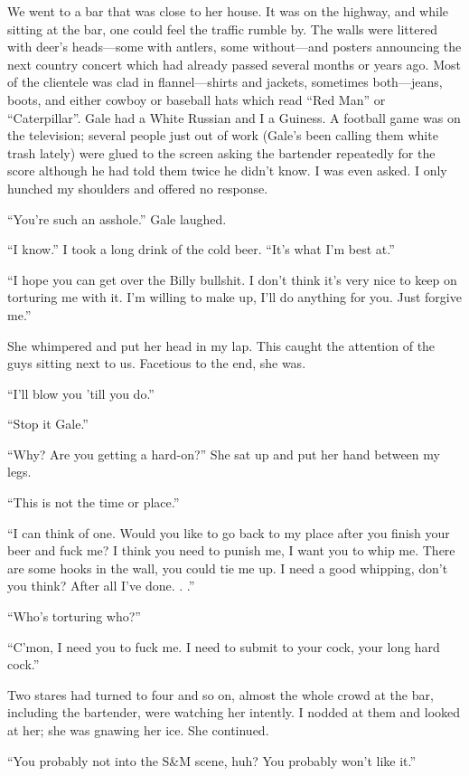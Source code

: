 We went to a bar that was close to her house. It was on the highway, and
while sitting at the bar, one could feel the traffic rumble by. The
walls were littered with deer's heads---some with antlers, some
without---and posters announcing the next country concert which had
already passed several months or years ago. Most of the clientele was
clad in flannel---shirts and jackets, sometimes both---jeans, boots, and
either cowboy or baseball hats which read ``Red Man'' or
``Caterpillar''. Gale had a White Russian and I a Guiness. A football
game was on the television; several people just out of work (Gale's been
calling them white trash lately) were glued to the screen asking the
bartender repeatedly for the score although he had told them twice he
didn't know. I was even asked. I only hunched my shoulders and offered
no response.

``You're such an asshole.'' Gale laughed.

``I know.'' I took a long drink of the cold beer. ``It's what I'm best
at.''

``I hope you can get over the Billy bullshit. I don't think it's very
nice to keep on torturing me with it. I'm willing to make up, I'll do
anything for you. Just forgive me.''

She whimpered and put her head in my lap. This caught the attention of
the guys sitting next to us. Facetious to the end, she was.

``I'll blow you 'till you do.''

``Stop it Gale.''

``Why? Are you getting a hard-on?'' She sat up and put her hand between
my legs.

``This is not the time or place.''

``I can think of one. Would you like to go back to my place after you
finish your beer and fuck me? I think you need to punish me, I want you
to whip me. There are some hooks in the wall, you could tie me up. I
need a good whipping, don't you think? After all I've done. . .''

``Who's torturing who?''

``C'mon, I need you to fuck me. I need to submit to your cock, your long
hard cock.''

Two stares had turned to four and so on, almost the whole crowd at the
bar, including the bartender, were watching her intently. I nodded at
them and looked at her; she was gnawing her ice. She continued.

``You probably not into the S\&M scene, huh? You probably won't like
it.''

